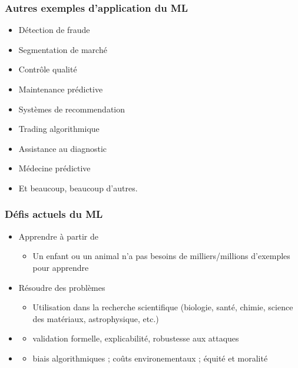 \begin{frame}
  \frametitle{Autres exemples d'application du ML}
  \begin{itemize}
  \item Détection de fraude 
  \item Segmentation de marché
  \item Contrôle qualité
  \item Maintenance prédictive 
  \item Systèmes de recommendation 
  \item Trading algorithmique
  \item Assistance au diagnostic
  \item Médecine prédictive 
  \item Et beaucoup, beaucoup d'autres.
  \end{itemize}
\end{frame}

\begin{frame}
  \frametitle{Défis actuels du ML}
  \begin{itemize}
  \item Apprendre à partir de 
    \begin{itemize}
    \item[] Un enfant ou un animal n'a pas besoins de milliers/millions
      d'exemples pour apprendre
    \end{itemize}
  \item Résoudre des problèmes 
    \begin{itemize}
    \item[] Utilisation dans la recherche scientifique (biologie, santé,
      chimie, science des matériaux, astrophysique, etc.)
    \end{itemize}
  \item {}
    \begin{itemize}
    \item[] validation formelle, explicabilité, robustesse aux attaques
  \end{itemize}
  \item {}
    \begin{itemize}
    \item[] biais algorithmiques ; coûts environementaux ; équité et moralité
    \end{itemize}
  \end{itemize}
\end{frame}

